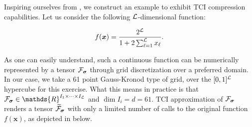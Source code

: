 \begin{example}
Inspiring ourselves from \cite{Fernandez2024}, we construct an example to exhibit TCI compression capabilities. Let us consider the following $\mathcal{L}$-dimensional function: 

\begin{equation}
	f(\boldsymbol{x}) = 
   \frac{2^{\mathcal{L}}}{1 + 2 \sum^{\mathcal{L}}_{\ell=1} x_\ell} .
   \label{eq:Ldimfunc}
\end{equation}

As one can easily understand, such a continuous function can be numerically represented by a tensor $\mathcal{F}_{\boldsymbol{\sigma}}$ through grid discretization over a preferred domain. In our case, we take a 61 point Gauss-Kronod type of grid, over the $[0,1]^{\mathcal{L}}$ hypercube for this exercise. What this means in practice is that $\mathcal{F}_{\bsigma} \in \mathds{R}^{I_1\times\dots\times I_\mL}$ and $\dim I_i = d = 61$. TCI approximation of $\mathcal{F}_{\boldsymbol{\sigma}}$ renders a tensor $\widetilde{\mathcal{F}}_{\boldsymbol{\sigma}}$ with only a limited number of calls to the original function $f(\boldsymbol{x})$, as depicted in  below. 


\end{example}
